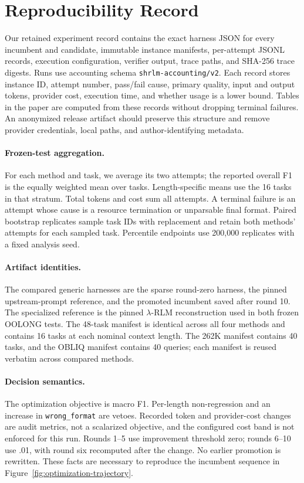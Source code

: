 \section{Reproducibility Record}
\label{app:repro}

Our retained experiment record contains the exact harness JSON for every
incumbent and candidate, immutable instance manifests, per-attempt JSONL records, execution
configuration, verifier output, trace paths, and SHA-256 trace digests. Runs use
accounting schema \texttt{shrlm-accounting/v2}. Each record stores instance ID,
attempt number, pass/fail cause, primary quality, input and output tokens,
provider cost, execution time, and whether usage is a lower bound. Tables in the
paper are computed from these records without dropping terminal failures. An
anonymized release artifact should preserve this structure and remove provider
credentials, local paths, and author-identifying metadata.

\paragraph{Frozen-test aggregation.}
For each method and task, we average its two attempts; the reported overall F1
is the equally weighted mean over tasks. Length-specific means use the 16 tasks
in that stratum. Total tokens and cost sum all attempts. A terminal failure is
an attempt whose cause is a resource termination or unparsable final format.
Paired bootstrap replicates sample task IDs with replacement and retain both
methods' attempts for each sampled task. Percentile endpoints use 200,000
replicates with a fixed analysis seed.

\paragraph{Artifact identities.}
The compared generic harnesses are the sparse round-zero harness, the pinned
upstream-prompt reference, and the promoted incumbent saved after round 10.
The specialized reference is the pinned $\lambda$-RLM reconstruction used in
both frozen OOLONG tests. The 48-task manifest is identical across all four
methods and contains 16 tasks at each nominal context length. The 262K manifest
contains 40 tasks, and the OBLIQ manifest contains 40 queries; each manifest is
reused verbatim across compared methods.

\paragraph{Decision semantics.}
The optimization objective is macro F1. Per-length non-regression and an
increase in \texttt{wrong\_format} are vetoes. Recorded token and provider-cost
changes are audit metrics, not a scalarized objective, and the configured cost
band is not enforced for this run. Rounds 1--5 use improvement threshold zero;
rounds 6--10 use .01, with round six recomputed after the change. No earlier
promotion is rewritten. These facts are necessary to reproduce the incumbent
sequence in Figure~\ref{fig:optimization-trajectory}.

